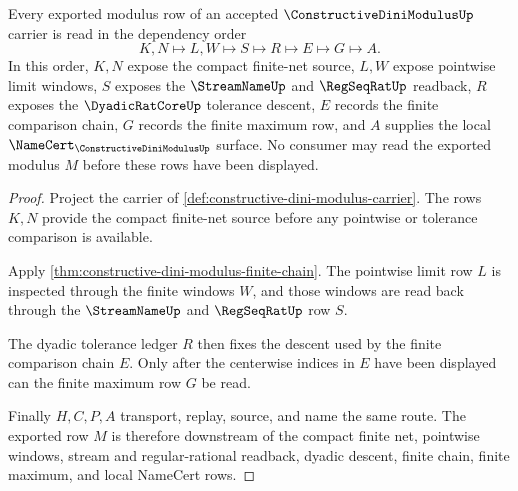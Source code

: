 \begin{theorem}
\label{thm:constructive-dini-modulus-obligation-lattice}
Every exported modulus row of an accepted $\ConstructiveDiniModulusUp$ carrier is read in the dependency order
$$
K,N \longmapsto L,W \longmapsto S \longmapsto R \longmapsto E \longmapsto G \longmapsto A .
$$
In this order, $K,N$ expose the compact finite-net source, $L,W$ expose pointwise limit windows, $S$ exposes the $\StreamNameUp$ and $\RegSeqRatUp$ readback, $R$ exposes the $\DyadicRatCoreUp$ tolerance descent, $E$ records the finite comparison chain, $G$ records the finite maximum row, and $A$ supplies the local $\NameCert_{\ConstructiveDiniModulusUp}$ surface. No consumer may read the exported modulus $M$ before these rows have been displayed.
\end{theorem}
\begin{proof}
Project the carrier of \autoref{def:constructive-dini-modulus-carrier}. The rows $K,N$ provide the compact finite-net source before any pointwise or tolerance comparison is available.

Apply \autoref{thm:constructive-dini-modulus-finite-chain}. The pointwise limit row $L$ is inspected through the finite windows $W$, and those windows are read back through the $\StreamNameUp$ and $\RegSeqRatUp$ row $S$.

The dyadic tolerance ledger $R$ then fixes the descent used by the finite comparison chain $E$. Only after the centerwise indices in $E$ have been displayed can the finite maximum row $G$ be read.

Finally $H,C,P,A$ transport, replay, source, and name the same route. The exported row $M$ is therefore downstream of the compact finite net, pointwise windows, stream and regular-rational readback, dyadic descent, finite chain, finite maximum, and local NameCert rows.
\end{proof}


